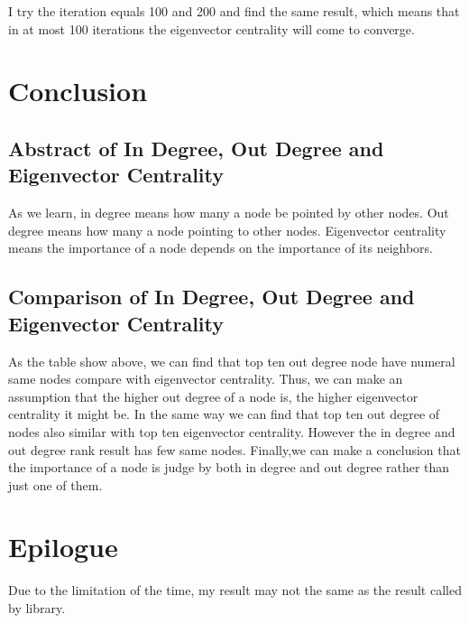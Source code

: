 \documentclass[titlepage,a4paper,12pt,thmsb]{report}
\begin{document}
\begin{center}
\begin{figure}[h]
{\par}
\end{figure}
{}
\end{center}

I try the iteration equals 100 and 200 and find the same result, which means that in at most 100 iterations the eigenvector centrality will come to converge.

\newpage


\chapter{Conclusion}
\section{ Abstract of In Degree, Out Degree and Eigenvector Centrality }

As we learn, in degree means how many a node be pointed by other nodes. Out degree means how many a node pointing to other nodes. Eigenvector centrality means the importance of a node depends on the importance of its neighbors.
\newpage
\section{Comparison of In Degree, Out Degree and Eigenvector Centrality }

As the table show above, we can find that top ten out degree node have numeral same nodes compare with eigenvector centrality.  Thus, we can make an assumption that the higher out degree of a node is, the higher eigenvector centrality it might be.  In the same way we can find that top ten out degree of nodes also similar with top ten eigenvector centrality.  However the in degree and out degree rank result has few same nodes.
\newline
\newline
Finally,we can make a conclusion that the importance of a node is judge by both in degree and out degree rather than just one of them.

\newpage


\chapter{Epilogue}
Due to the limitation of the time, my result may not the same as the result called by library.
\end{document}
